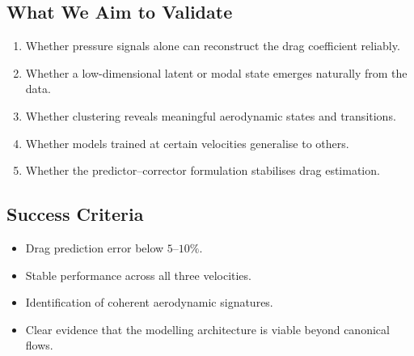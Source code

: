 \documentclass[12pt]{article}
\begin{document}
\subsection*{What We Aim to Validate}
\begin{enumerate}
    \item Whether pressure signals alone can reconstruct the drag coefficient reliably.
    \item Whether a low-dimensional latent or modal state emerges naturally from the data.
    \item Whether clustering reveals meaningful aerodynamic states and transitions.
    \item Whether models trained at certain velocities generalise to others.
    \item Whether the predictor--corrector formulation stabilises drag estimation.
\end{enumerate}

\subsection*{Success Criteria}
\begin{itemize}
    \item Drag prediction error below $5$--$10\%$.
    \item Stable performance across all three velocities.
    \item Identification of coherent aerodynamic signatures.
    \item Clear evidence that the modelling architecture is viable beyond canonical flows.
\end{itemize}
\end{document}
